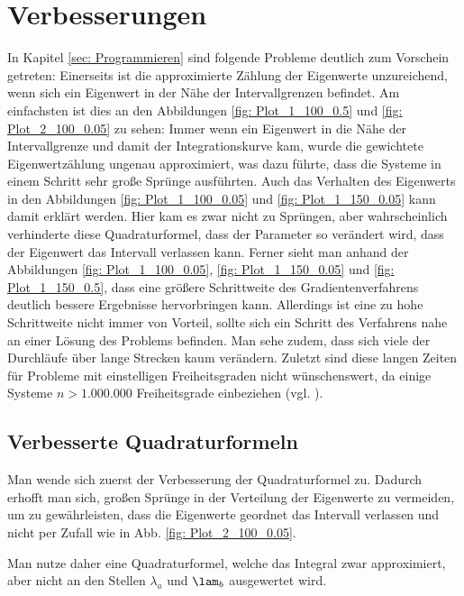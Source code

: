 \documentclass[a4paper,12pt]{report}
\newcommand{\1}{\mathds{1}}
\theoremstyle{plain} %
\theoremstyle{definition} %
\theoremstyle{remark}
\begin{document}
\chapter{Verbesserungen}
\label{sec: Verbesserungen}
      In Kapitel \ref{sec: Programmieren} sind folgende Probleme deutlich zum Vorschein getreten:
      Einerseits ist die approximierte Zählung der Eigenwerte unzureichend, wenn sich ein Eigenwert in der Nähe der Intervallgrenzen befindet.
      Am einfachsten ist dies an den Abbildungen \ref{fig: Plot_1_100_0.5} und \ref{fig: Plot_2_100_0.05} zu sehen:
      Immer wenn ein Eigenwert in die Nähe der Intervallgrenze und damit der Integrationskurve kam,
      wurde die gewichtete Eigenwertzählung ungenau approximiert, was dazu führte, dass die Systeme in einem Schritt sehr große Sprünge ausführten.
      Auch das Verhalten des Eigenwerts in den Abbildungen \ref{fig: Plot_1_100_0.05} und \ref{fig: Plot_1_150_0.05} kann damit erklärt werden.
      Hier kam es zwar nicht zu Sprüngen, aber wahrscheinlich verhinderte diese Quadraturformel, dass der Parameter so verändert wird,
      dass der Eigenwert das Intervall verlassen kann.
      Ferner sieht man anhand der Abbildungen \ref{fig: Plot_1_100_0.05}, \ref{fig: Plot_1_150_0.05} und \ref{fig: Plot_1_150_0.5},
      dass eine größere Schrittweite des Gradientenverfahrens deutlich bessere Ergebnisse hervorbringen kann.
      Allerdings ist eine zu hohe Schrittweite nicht immer von Vorteil, sollte sich ein Schritt des Verfahrens nahe an einer Lösung des Problems befinden.
      Man sehe zudem, dass sich viele der Durchläufe über lange Strecken kaum verändern.
      Zuletzt sind diese langen Zeiten für Probleme mit einstelligen Freiheitsgraden nicht wünschenswert,
      da einige Systeme $n>1.000.000$ Freiheitsgrade einbeziehen (vgl. \cite[S. 359]{maschinendynamikDresig}).

      \section{Verbesserte Quadraturformeln}
            Man wende sich zuerst der Verbesserung der Quadraturformel zu.
            Dadurch erhofft man sich, großen Sprünge in der Verteilung der Eigenwerte zu vermeiden, um zu gewährleisten,
            dass die Eigenwerte geordnet das Intervall verlassen und nicht per Zufall wie in Abb. \ref{fig: Plot_2_100_0.05}.

            Man nutze daher eine Quadraturformel, welche das Integral zwar approximiert, aber nicht an den Stellen $\lambda_a$ und $\lam_b$ ausgewertet wird.
\end{document}
